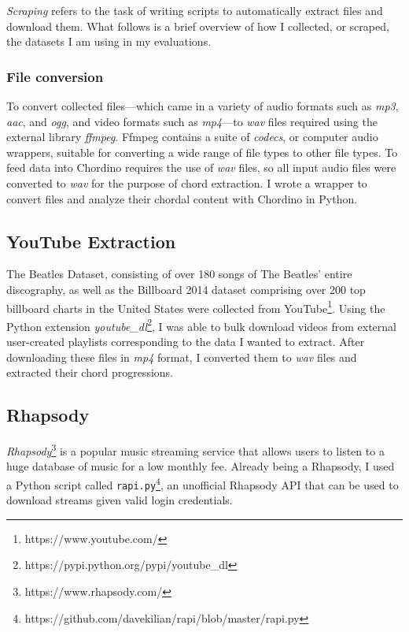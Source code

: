 \textit{Scraping} refers to the task of writing scripts to automatically extract files and download them. What follows is a brief overview of how I collected, or scraped, the datasets I am using in my evaluations.

\subsubsection{File conversion}

To convert collected files---which came in a variety of audio formats such as \textit{mp3}, \textit{aac}, and \textit{ogg}, and video formats such as \textit{mp4}---to \textit{wav} files required using the external library \textit{ffmpeg}. Ffmpeg contains a suite of \textit{codecs}, or computer audio wrappers, suitable for converting a wide range of file types to other file types. To feed data into Chordino requires the use of \textit{wav} files, so all input audio files were converted to \textit{wav} for the purpose of chord extraction. I wrote a wrapper to convert files and analyze their chordal content with Chordino in Python.

\subsection{YouTube Extraction}

The Beatles Dataset, consisting of over 180 songs of The Beatles' entire discography, as well as the Billboard 2014 dataset comprising over 200 top billboard charts in the United States were collected from YouTube\footnote{https://www.youtube.com/}. Using the Python extension \textit{youtube_dl}\footnote{https://pypi.python.org/pypi/youtube_dl}, I was able to bulk download videos from external user-created playlists corresponding to the data I wanted to extract. After downloading these files in \textit{mp4} format, I converted them to \textit{wav} files and extracted their chord progressions.

\subsection{Rhapsody}

\textit{Rhapsody}\footnote{https://www.rhapsody.com/} is a popular music streaming service that allows users to listen to a huge database of music for a low monthly fee. Already being a Rhapsody, I used a Python script called \texttt{rapi.py}\footnote{https://github.com/davekilian/rapi/blob/master/rapi.py}, an unofficial Rhapsody API that can be used to download streams given valid login credentials.

